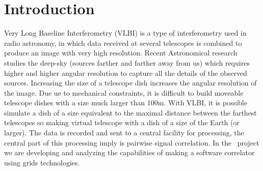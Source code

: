 \section{Introduction}
Very Long Baseline Interferometry (VLBI) \cite{VLBIbook} is a type of
interferometry used in radio astronomy, in which data received at
several telescopes is combined to produce an image with very high
resolution. 
Recent Astronomical research studies the deep-sky (sources farther and
farther away from us) which requires higher and higher angular
resolution to capture all the details of the observed sources.
Increasing the size of a telescope dish increases the angular
resolution of the image. Due ue to mechanical constraints, it
is difficult to build moveable telescope dishes with a size much
larger than 100m. With VLBI, it is possible simulate a dish of a size 
equivalent to the maximal distance between the farthest telescopes  so making virtual telescope with
a dish of a size of the Earth (or larger). The data is recorded
and sent to a central facility for processing, the central part of this
processing imply is pairwise signal correlation. In
the \scarie\ project we are developing and analyzing the capabilities
of making a software correlator using grids technologies.

